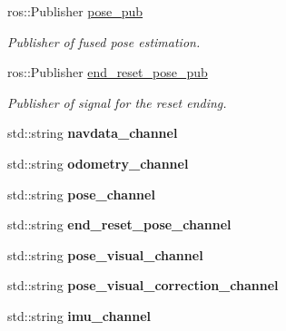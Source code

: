 \begin{DoxyCompactItemize}
\mbox{\label{classPoseEstimator_af67c0ef508b43d003a526e446ead55b7}} 
ros\+::\+Publisher \hyperlink{classPoseEstimator_af67c0ef508b43d003a526e446ead55b7}{pose\+\_\+pub}
\begin{DoxyCompactList}\small\item\em Publisher of fused pose estimation. \end{DoxyCompactList}\item 
\mbox{\label{classPoseEstimator_a003cb92c65e3df8ee3eec5457c2cb14a}} 
ros\+::\+Publisher \hyperlink{classPoseEstimator_a003cb92c65e3df8ee3eec5457c2cb14a}{end\+\_\+reset\+\_\+pose\+\_\+pub}
\begin{DoxyCompactList}\small\item\em Publisher of signal for the reset ending. \end{DoxyCompactList}\item 
\mbox{\label{classPoseEstimator_a996d417c3aa31ef1df69d3924e722a50}} 
std\+::string {\bfseries navdata\+\_\+channel}
\item 
\mbox{\label{classPoseEstimator_a70457beb87cde6d1de96cab86672b8e7}} 
std\+::string {\bfseries odometry\+\_\+channel}
\item 
\mbox{\label{classPoseEstimator_a41f6270fda106d3d8aea45199c99c569}} 
std\+::string {\bfseries pose\+\_\+channel}
\item 
\mbox{\label{classPoseEstimator_a99620f9d6575c1ef5a7301366b9a8c11}} 
std\+::string {\bfseries end\+\_\+reset\+\_\+pose\+\_\+channel}
\item 
\mbox{\label{classPoseEstimator_ac9a299435f631cb8f90a2e4ef4b5d999}} 
std\+::string {\bfseries pose\+\_\+visual\+\_\+channel}
\item 
\mbox{\label{classPoseEstimator_af98830c98e1e4d08422b2331e775ac08}} 
std\+::string {\bfseries pose\+\_\+visual\+\_\+correction\+\_\+channel}
\item 
\mbox{\label{classPoseEstimator_aeb15fe957ded7a90c5ad14aaf1e4d1d0}} 
std\+::string {\bfseries imu\+\_\+channel}

\end{DoxyCompactItemize}
